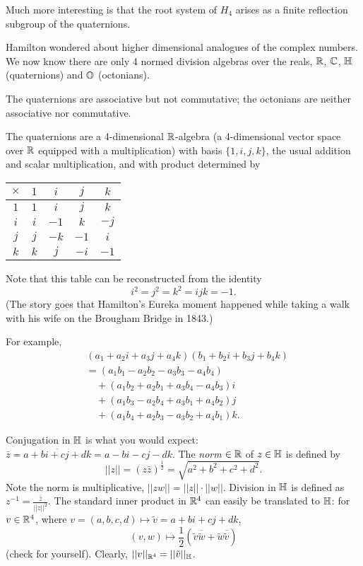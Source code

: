 Much more interesting is that the root system of $H_4$ arises as a finite
reflection subgroup of the quaternions.

Hamilton wondered about higher dimensional analogues of the complex numbers.
We now know there are only 4 normed division algebras over the reals, $\mathbb{R}$,
$\mathbb{C}$, $\mathbb{H}$ (quaternions) and $\mathbb{O}$ (octonians).

The quaternions are associative but not commutative; the octonians are neither
associative nor commutative.

The quaternions are a 4-dimensional $\mathbb{R}$-algebra (a 4-dimensional vector space
over $\mathbb{R}$ equipped with a multiplication) with basis $\{1, i, j, k\}$, the
usual addition and scalar multiplication, and with product determined by

\begin{tabular}{c|cccc}
$\times$ & $1$ & $i$ & $j$ & $k$ \\
\hline
$1$ & $1$ & $i$ & $j$ & $k$ \\
$i$ & $i$ & $-1$ & $k$ & $-j$ \\
$j$ & $j$ & $-k$ & $-1$ & $i$ \\
$k$ & $k$ & $j$ & $-i$ & $-1$
\end{tabular}

Note that this table can be reconstructed from the identity
\[
    i^2 = j^2 = k^2 = ijk = -1.
\]
(The story goes that Hamilton's Eureka moment happened while taking a walk with
his wife on the Brougham Bridge in 1843.)

For example,
\begin{align*}
    &(a_1 + a_2 i + a_3 j + a_4 k)(b_1 + b_2 i + b_3 j + b_4 k) \\
    &= (a_1 b_1 - a_2 b_2 - a_3 b_3 - a_4 b_4) \\
    & \quad + (a_1 b_2 + a_2 b_1 + a_3 b_4 - a_4 b_3)i \\
    & \quad + (a_1 b_3 - a_2 b_4 + a_3 b_1 + a_4 b_2)j \\
    & \quad + (a_1 b_4 + a_2 b_3 - a_3 b_2 + a_4 b_1)k.
\end{align*}

Conjugation in $\mathbb{H}$ is what you would expect:
$\bar{z} = \overline{a + bi + cj + dk} = a - bi - cj - dk$.
The {\em norm} $\in \mathbb{R}$ of $z \in \mathbb{H}$ is defined by
\[
    ||z|| = (z \bar{z})^{\frac{1}{2}} = \sqrt{a^2 + b^2 + c^2 + d^2}.
\]
Note the norm is multiplicative, $||zw|| = ||z|| \cdot ||w||$. Division in
$\mathbb{H}$ is defined as $z^{-1} = \frac{\bar{z}}{||z||^2}$. The standard inner
product in $\mathbb{R}^4$ can easily be translated to $\mathbb{H}$: for $v \in \mathbb{R}^4$,
where $v = (a,b,c,d) \mapsto \tilde{v} = a+bi+cj+dk$,
\[
    (v, w) \mapsto \frac{1}{2} \left( \tilde{v} \overline{\tilde{w}}
    + \tilde{w} \overline{\tilde{v}} \right)
\]
(check for yourself).
Clearly, $||v||_{\mathbb{R}^4} = ||\tilde{v}||_{\mathbb{H}}$.

